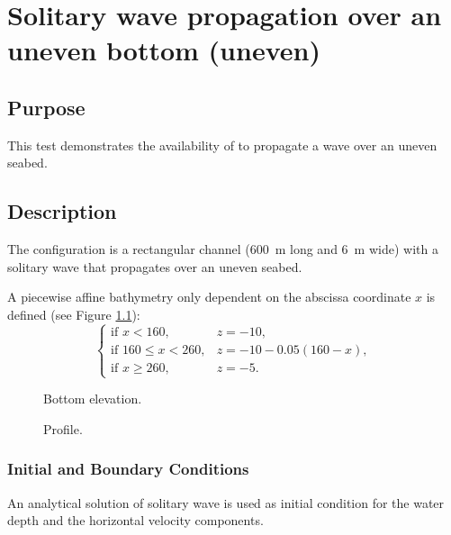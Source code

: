 \chapter{Solitary wave propagation over an uneven bottom (uneven)}

\section{Purpose}

This test demonstrates the availability of  to propagate
a wave over an uneven seabed.

\section{Description}

The configuration is a rectangular channel (600~m long and 6~m wide)
with a solitary wave that propagates over an uneven seabed.

A piecewise affine bathymetry only dependent on the abscissa coordinate
$x$ is defined (see Figure \ref{t3d:uneven:fig:Bottom}):
\begin{equation*}
\left\{
\begin{array}{rl}
  \textrm{if } x < 160, & z = -10,\\
  \textrm{if } 160 \le x < 260, & z = -10-0.05(160-x),\\
  \textrm{if } x \ge 260, & z = -5.
\end{array}
\right.
\end{equation*}

\begin{figure}[!htbp]
 \centering
 \caption{Bottom elevation.}
 \label{t3d:uneven:fig:Bottom}
\end{figure}

\begin{figure}[!htbp]
 \centering
 \caption{Profile.}
 \label{t3d:uneven:fig:Profil}
\end{figure}

\subsection{Initial and Boundary Conditions}

An analytical solution of solitary wave is used as initial condition for
the water depth and the horizontal velocity components.

